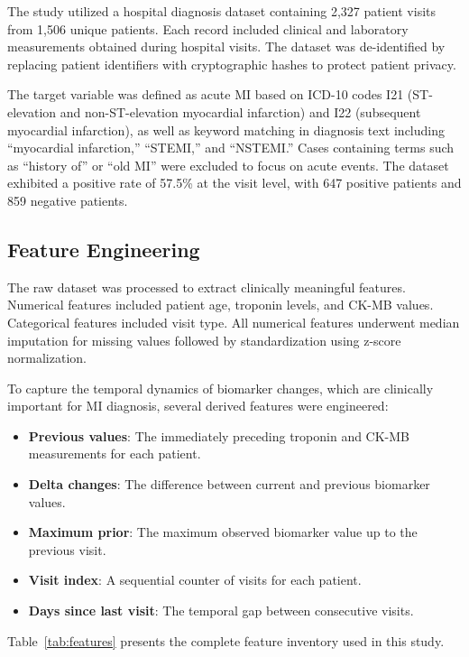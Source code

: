 \documentclass[fleqn,10pt,lineno]{wlpeerj}
\begin{document}
The study utilized a hospital diagnosis dataset containing 2,327 patient visits from 1,506 unique patients. Each record included clinical and laboratory measurements obtained during hospital visits. The dataset was de-identified by replacing patient identifiers with cryptographic hashes to protect patient privacy.

The target variable was defined as acute MI based on ICD-10 codes I21 (ST-elevation and non-ST-elevation myocardial infarction) and I22 (subsequent myocardial infarction), as well as keyword matching in diagnosis text including ``myocardial infarction,'' ``STEMI,'' and ``NSTEMI.'' Cases containing terms such as ``history of'' or ``old MI'' were excluded to focus on acute events. The dataset exhibited a positive rate of 57.5\% at the visit level, with 647 positive patients and 859 negative patients.

\subsection*{Feature Engineering}

The raw dataset was processed to extract clinically meaningful features. Numerical features included patient age, troponin levels, and CK-MB values. Categorical features included visit type. All numerical features underwent median imputation for missing values followed by standardization using z-score normalization.

To capture the temporal dynamics of biomarker changes, which are clinically important for MI diagnosis, several derived features were engineered:
\begin{itemize}[noitemsep]
\item \textbf{Previous values}: The immediately preceding troponin and CK-MB measurements for each patient.
\item \textbf{Delta changes}: The difference between current and previous biomarker values.
\item \textbf{Maximum prior}: The maximum observed biomarker value up to the previous visit.
\item \textbf{Visit index}: A sequential counter of visits for each patient.
\item \textbf{Days since last visit}: The temporal gap between consecutive visits.
\end{itemize}

Table~\ref{tab:features} presents the complete feature inventory used in this study.
\end{document}
